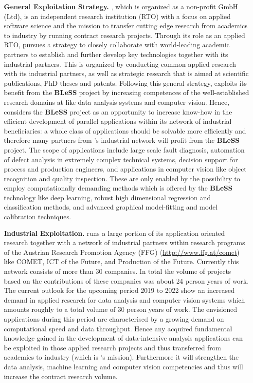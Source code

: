 \documentclass[a4paper,11pt]{article}
\newcommand{\project}[1]{\textbf{#1}\xspace}
\newcommand{\BLESS}{\project{BLeSS}}
\newcommand{\TheProject}{\BLESS}
\begin{document}
\textbf{General Exploitation Strategy.} \SCCHshort{}, which is organized as a non-profit GmbH (Ltd), is an independent research
institution (RTO) with a focus on applied software science and the mission to transfer cutting edge research from
academics to industry by running contract research projects. Through its role as an applied RTO, \SCCHshort{} pursues a strategy
to closely collaborate with world-leading academic partners to establish and further develop key technologies together
with its industrial partners. This is organized by conducting common applied research with its industrial partners,
as well as strategic research that is aimed at scientific publications, PhD theses and patents. Following this general strategy,
\SCCHshort{} exploits its benefit from the \TheProject{} project by increasing competences of the well-established research
domains at \SCCHshort{} like data analysis systems and computer vision. Hence, \SCCHshort{} considers the \TheProject{} project
as an opportunity to increase know-how in the efficient development of parallel applications within its network of
industrial beneficiaries: a whole class of applications should be solvable more efficiently and therefore many partners
from \SCCHshort{}'s industrial network will profit from the \TheProject{} project. The scope of applications include large
scale fault diagnosis, automation of defect analysis in extremely complex technical systems, decision support for
process and production engineers, and applications in computer vision like object recognition and quality inspection.
These are only enabled by the possibility to employ computationally demanding methods which is offered by the
\TheProject{} technology like deep learning, robust high dimensional regression and classification methods, and
advanced graphical model-fitting and model calibration techniques.

\textbf{Industrial Exploitation.} \SCCHshort{} runs a large portion of its application oriented research together with a
network of industrial partners within research programs of the Austrian Research Promotion Agency (FFG) (\url{http://www.ffg.at/comet}) 
like COMET, ICT of the Future, and Production of the Future. Currently this network
consists of more than 30 companies. In total the volume of projects based on the contributions of these companies was about
24 person years of work. The current outlook for the upcoming period 2019 to 2022 show an increased demand in
applied research for data analysis and computer vision systems which amounts roughly to a total volume of 30 person years of work. The envisioned
applications during this period are characterised by a growing demand on computational speed and data throughput.
Hence any acquired fundamental knowledge gained in the development of data-intensive analysis applications can
be exploited in those applied research projects and thus transferred from academics to industry (which is \SCCHshort{}'s
mission). Furthermore it will strengthen the data analysis, machine learning and computer vision competencies and
thus will increase the contract research volume.
\end{document}
